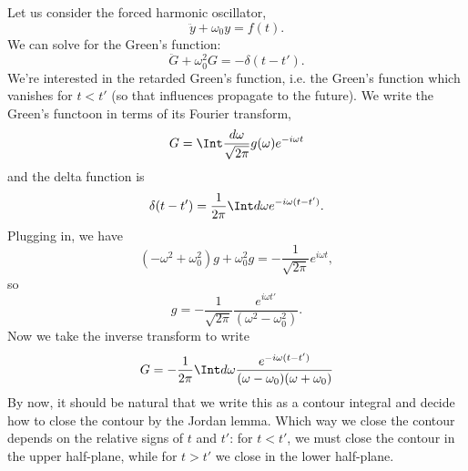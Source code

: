\begin{exm}
    Let us consider the forced harmonic oscillator,
    \begin{equation}
        \ddot y + \omega_0 y = f(t).
    \end{equation}
    We can solve for the Green's function:
    \begin{equation}
        \ddot G + \omega_0^2 G = -\delta(t-t').
    \end{equation}
    We're interested in the retarded Green's function, i.e. the Green's function which vanishes for $t<t'$ (so that influences propagate to the future). We write the Green's functoon in terms of its Fourier transform,
    \begin{equation}
        G= \Int \frac{d\omega}{\sqrt{2\pi}} g(\omega) e^{-i\omega t}
    \end{equation}
    and the delta function is
    \begin{equation}
        \delta(t-t') = \frac{1}{2\pi} \Int d\omega e^{-i\omega(t-t')}.
    \end{equation}
    Plugging in, we have
    \begin{equation}
        (-\omega^2 +\omega_0^2)g + \omega_0^2 g = -\frac{1}{\sqrt{2\pi}} e^{i\omega t},
    \end{equation}
    so
    \begin{equation}
        g = -\frac{1}{\sqrt{2\pi}} \frac{e^{i\omega t'}}{(\omega^2-\omega_0^2)}.
    \end{equation}
    Now we take the inverse transform to write
    \begin{equation}
        G= -\frac{1}{2\pi} \Int d\omega \frac{e^{-i\omega(t-t')}}{(\omega-\omega_0)(\omega+\omega_0)}
    \end{equation}
    By now, it should be natural that we write this as a contour integral and decide how to close the contour by the Jordan lemma. Which way we close the contour depends on the relative signs of $t$ and $t'$: for $t<t'$, we must close the contour in the upper half-plane, while for $t>t'$ we close in the lower half-plane.
    

\end{exm}
